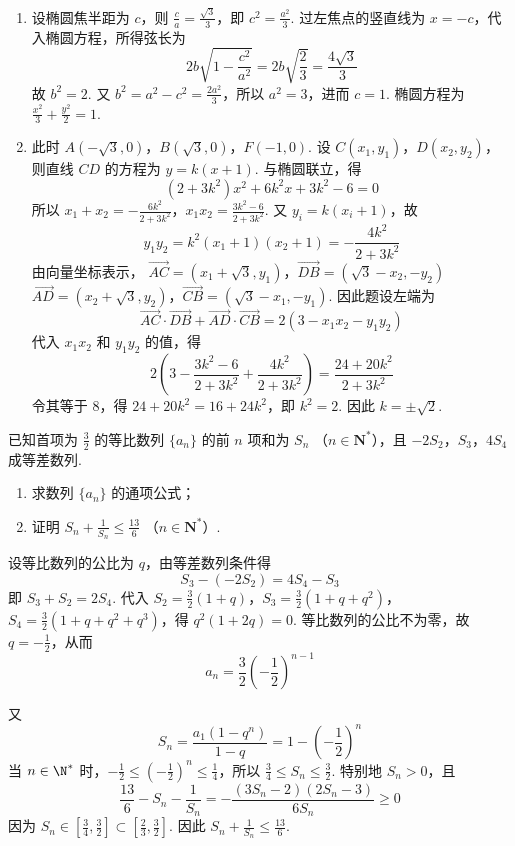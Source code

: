 \begin{solution}
\begin{enumerate}
\item 设椭圆焦半距为 \(c\)，则 \(\frac{c}{a}=\frac{\sqrt{3}}{3}\)，即 \(c^2=\frac{a^2}{3}\). 过左焦点的竖直线为 \(x=-c\)，代入椭圆方程，所得弦长为
\[
2b\sqrt{1-\frac{c^2}{a^2}}=2b\sqrt{\frac{2}{3}}=\frac{4\sqrt{3}}{3}
\]
故 \(b^2=2\). 又 \(b^2=a^2-c^2=\frac{2a^2}{3}\)，所以 \(a^2=3\)，进而 \(c=1\). 椭圆方程为
\(\frac{x^2}{3}+\frac{y^2}{2}=1\).

\item 此时 \(A(-\sqrt{3},0)\)，\(B(\sqrt{3},0)\)，\(F(-1,0)\). 设
\(C(x_1,y_1)\)，\(D(x_2,y_2)\)，则直线 \(CD\) 的方程为 \(y=k(x+1)\). 与椭圆联立，得
\[
(2+3k^2)x^2+6k^2x+3k^2-6=0
\]
所以
\(x_1+x_2=-\frac{6k^2}{2+3k^2}\)，\(x_1x_2=\frac{3k^2-6}{2+3k^2}\).
又 \(y_i=k(x_i+1)\)，故
\[
y_1y_2=k^2(x_1+1)(x_2+1)=-\frac{4k^2}{2+3k^2}
\]
由向量坐标表示，
\(\overrightarrow{AC}=\left(x_1+\sqrt{3},y_1\right)\)，\(\overrightarrow{DB}=\left(\sqrt{3}-x_2,-y_2\right)\)
\(\overrightarrow{AD}=\left(x_2+\sqrt{3},y_2\right)\)，\(\overrightarrow{CB}=\left(\sqrt{3}-x_1,-y_1\right)\).
因此题设左端为
\[
\overrightarrow{AC}\cdot\overrightarrow{DB}
+\overrightarrow{AD}\cdot\overrightarrow{CB}
=2\left(3-x_1x_2-y_1y_2\right)
\]
代入 \(x_1x_2\) 和 \(y_1y_2\) 的值，得
\[
2\left(3-\frac{3k^2-6}{2+3k^2}+\frac{4k^2}{2+3k^2}\right)
=\frac{24+20k^2}{2+3k^2}
\]
令其等于 \(8\)，得 \(24+20k^2=16+24k^2\)，即 \(k^2=2\). 因此 \(k=\pm\sqrt{2}\).
\end{enumerate}
\end{solution}

\begin{problem}
已知首项为 \(\frac{3}{2}\) 的等比数列 \(\{a_{n}\}\) 的前 \(n\) 项和为 \(S_{n}\) （\(n \in \mathbf{N}^{*}\)），且 \(-2S_{2}\)，\(S_{3}\)，\(4S_{4}\) 成等差数列.
\begin{enumerate}
\item 求数列 \( \{a_{n}\} \) 的通项公式；
\item 证明 \(S_{n} + \frac{1}{S_{n}} \leqslant \frac{13}{6} \) （\(n \in \mathbf{N}^{*}\)）.
\end{enumerate}
\end{problem}

\begin{solution}
设等比数列的公比为 \(q\)，由等差数列条件得
\[
S_3-(-2S_2)=4S_4-S_3
\]
即 \(S_3+S_2=2S_4\). 代入
\(S_2=\frac{3}{2}(1+q)\)，\(S_3=\frac{3}{2}(1+q+q^2)\)，\(S_4=\frac{3}{2}(1+q+q^2+q^3)\)，得
\(q^2(1+2q)=0\). 等比数列的公比不为零，故 \(q=-\frac{1}{2}\)，从而
\[
a_n=\frac{3}{2}\left(-\frac{1}{2}\right)^{n-1}
\]

又
\[
S_n=\frac{a_1(1-q^n)}{1-q}=1-\left(-\frac{1}{2}\right)^n
\]
当 \(n\in\N^*\) 时，\(-\frac{1}{2}\leqslant\left(-\frac{1}{2}\right)^n\leqslant\frac{1}{4}\)，所以 \(\frac{3}{4}\leqslant S_n\leqslant\frac{3}{2}\). 特别地 \(S_n>0\)，且
\[
\frac{13}{6}-S_n-\frac{1}{S_n}
=-\frac{(3S_n-2)(2S_n-3)}{6S_n}\geqslant 0
\]
因为 \(S_n\in\left[\frac{3}{4},\frac{3}{2}\right]\subset\left[\frac{2}{3},\frac{3}{2}\right]\). 因此
\(S_n+\frac{1}{S_n}\leqslant\frac{13}{6}\).
\end{solution}


